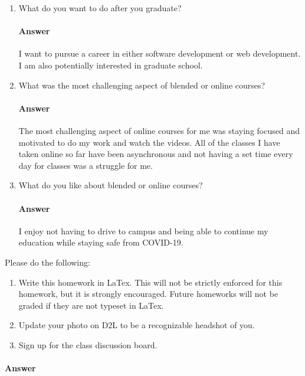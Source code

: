 \documentclass{article}
\begin{document}
\begin{enumerate}
    \item What do you want to do after you graduate?
        \paragraph{Answer} I want to pursue a career in either software development or web development. I am also potentially interested in graduate school.

    \item What was the most challenging aspect of blended or online courses?
        \paragraph{Answer} The most challenging aspect of online courses for me was staying focused and motivated to do my work and watch the videos. All of the classes I have taken online so far have been asynchronous and not having a set time every day for classes was a struggle for me.

    \item What do you like about blended or online courses?
        \paragraph{Answer} I enjoy not having to drive to campus and being able to continue my education while staying safe from COVID-19.

\end{enumerate}


Please do the following:
\begin{enumerate}
    \item Write this homework in LaTex. This will not be strictly enforced for
        this homework, but it is strongly encouraged.  Future homeworks will not
        be graded if they are not typeset in LaTex.
    \item Update your photo on D2L to be a recognizable headshot of you.
    \item Sign up for the class discussion board.
\end{enumerate}

\paragraph{Answer}
\end{document}
